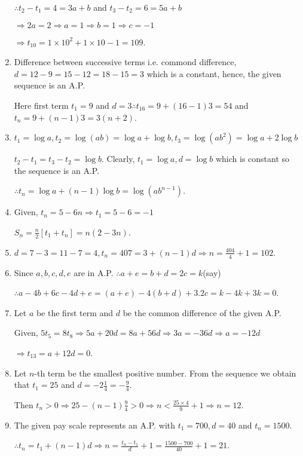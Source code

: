\begin{enumerate}
  $\therefore t_2 - t_1 = 4 = 3a + b$ and $t_3 - t_2 = 6 = 5a + b$

  $\Rightarrow 2a = 2 \Rightarrow a = 1 \Rightarrow b = 1 \Rightarrow c = -1$

  $\Rightarrow t_{10} = 1\times10^2 + 1\times10 - 1 = 109$.
\item Difference between successive terms i.e. commond difference, $d = 12 - 9 = 15 - 12 = 18 - 15 = 3$ which is a constant, hence,
  the given sequence is an A.P.

  Here first term $t_1 = 9$ and $d = 3 \therefore t_{16} = 9 + (16 - 1)3 = 54$ and $t_n = 9 + (n - 1)3 = 3(n + 2)$.
\item $t_1 = \log a, t_2 = \log(ab) = \log a + \log b, t_3 = \log(ab^2) = \log a + 2\log b$

  $t_2 - t_1 = t_3 - t_2 = \log b$. Clearly, $t_1 = \log a, d = \log b$ which is constant so the sequence is an A.P.

  $\therefore t_n = \log a + (n - 1)\log b = \log(ab^{n - 1})$.
\item Given, $t_n = 5 - 6n \Rightarrow t_1 = 5 - 6 = -1$

  $S_n = \frac{n}{2}[t_1 + t_n] = n(2 - 3n)$.
\item $d = 7 - 3 = 11 -7 = 4, t_n = 407 = 3 + (n - 1)d \Rightarrow n = \frac{404}{4} + 1 = 102$.
\item Since $a, b, c, d, e$ are in A.P. $\therefore a + e = b + d = 2c = k$(say)

  $\therefore a - 4b + 6c - 4d + e = (a + e) - 4(b + d) + 3.2c = k - 4k + 3k = 0$.
\item Let $a$ be the first term and $d$ be the common difference of the given A.P.

  Given, $5t_5 = 8t_8 \Rightarrow 5a + 20d = 8a + 56d \Rightarrow 3a = -36d \Rightarrow a = -12d$

  $\Rightarrow t_{13} = a + 12d = 0$.
\item Let $n$-th term be the smallest positive number. From the sequence we obtain that $t_1 = 25$ and $d = -2\frac{1}{4} = -\frac{9}{4}$.

  Then $t_n > 0 \Rightarrow 25 - (n - 1)\frac{9}{4} > 0\Rightarrow n < \frac{25\times4}{9} + 1 \Rightarrow n = 12$.
\item The given pay scale represents an A.P. with $t_1 = 700, d = 40$ and $t_n = 1500$.

  $\therefore t_n = t_1 + (n - 1)d \Rightarrow n = \frac{t_n - t_1}{d} + 1 = \frac{1500 - 700}{40} + 1 = 21$.


\end{enumerate}
